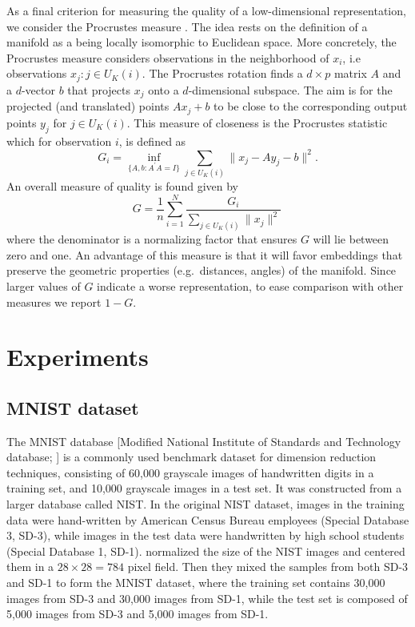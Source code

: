 \documentclass[11pt,a4paper,]{article}
\begin{document}
As a final criterion for measuring the quality of a low-dimensional representation, we consider the Procrustes measure \autocite{Goldberg2009-tb}. The idea rests on the definition of a manifold as a being locally isomorphic to Euclidean space. More concretely, the Procrustes measure considers observations in the neighborhood of \(x_i\), i.e observations \(x_j:j\in U_K(i)\). The Procrustes rotation finds a \(d\times p\) matrix \(A\) and a \(d\)-vector \(b\) that projects \(x_j\) onto a \(d\)-dimensional subspace. The aim is for the projected (and translated) points \(Ax_j+b\) to be close to the corresponding output points \(y_j\) for \(j\in U_K(i)\). This measure of closeness is the Procrustes statistic which for observation \(i\), is defined as
\begin{equation}\label{eq:procstats}
  G_i= \inf _{\{A,b: A^{\prime} A=I\}} \sum_{j\in U_K(i)}\|x_{j}-A y_{j}-b\|^{2}.
\end{equation}
An overall measure of quality is found given by
\begin{equation}\label{eq:procmeasure}
  G=\frac{1}{n}\sum\limits_{i=1}^N\frac{G_i}{\sum_{j\in U_K(i)}\|x_{j}\|^{2}}\,
\end{equation}
where the denominator is a normalizing factor that ensures \(G\) will lie between zero and one. An advantage of this measure is that it will favor embeddings that preserve the geometric properties (e.g.~distances, angles) of the manifold. Since larger values of \(G\) indicate a worse representation, to ease comparison with other measures we report \(1-G\).

\hypertarget{experiment}{%
\section{Experiments}\label{experiment}}

\hypertarget{mnist-dataset}{%
\subsection{MNIST dataset}\label{mnist-dataset}}

The MNIST database {[}Modified National Institute of Standards and Technology database; \textcite{lecun2010mnist}{]} is a commonly used benchmark dataset for dimension reduction techniques, consisting of 60,000 grayscale images of handwritten digits in a training set, and 10,000 grayscale images in a test set. It was constructed from a larger database called NIST. In the original NIST dataset, images in the training data were hand-written by American Census Bureau employees (Special Database 3, SD-3), while images in the test data were handwritten by high school students (Special Database 1, SD-1). \textcite{lecun2010mnist} normalized the size of the NIST images and centered them in a \(28\times 28=784\) pixel field. Then they mixed the samples from both SD-3 and SD-1 to form the MNIST dataset, where the training set contains 30,000 images from SD-3 and 30,000 images from SD-1, while the test set is composed of 5,000 images from SD-3 and 5,000 images from SD-1.
\end{document}
